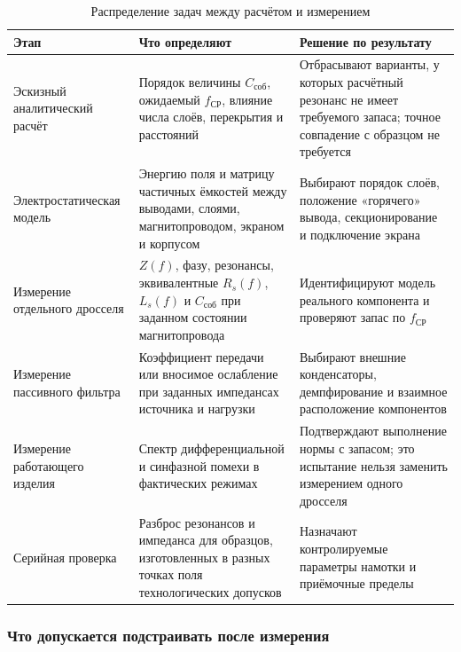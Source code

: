 \documentclass[14pt,a4paper]{extarticle}
\begin{document}
\begin{table}[htbp]
\begin{singlespace}
\caption{Распределение задач между расчётом и измерением}
\label{tab:calculation-versus-measurement}
\centering
\small
\begin{tabularx}{\textwidth}{>{\raggedright\arraybackslash}p{31mm}
>{\raggedright\arraybackslash}p{49mm}
>{\raggedright\arraybackslash}X}
\toprule
Этап & Что определяют & Решение по результату \\
\midrule
Эскизный аналитический расчёт &
Порядок величины $C_{\text{соб}}$, ожидаемый $f_{\text{СР}}$, влияние числа
слоёв, перекрытия и расстояний &
Отбрасывают варианты, у которых расчётный резонанс не имеет требуемого
запаса; точное совпадение с образцом не требуется \\
Электро\-статическая модель &
Энергию поля и матрицу частичных ёмкостей между выводами, слоями,
магнитопроводом, экраном и корпусом &
Выбирают порядок слоёв, положение «горячего» вывода, секционирование и
подключение экрана \\
Измерение отдельного дросселя &
$Z(f)$, фазу, резонансы, эквивалентные $R_s(f)$, $L_s(f)$ и
$C_{\text{соб}}$ при заданном состоянии магнитопровода &
Идентифицируют модель реального компонента и проверяют запас по
$f_{\text{СР}}$ \\
Измерение пассивного фильтра &
Коэффициент передачи или вносимое ослабление при заданных импедансах
источника и нагрузки &
Выбирают внешние конденсаторы, демпфирование и взаимное расположение
компонентов \\
Измерение работающего изделия &
Спектр дифференциальной и синфазной помехи в фактических режимах &
Подтверждают выполнение нормы с запасом; это испытание нельзя заменить
измерением одного дросселя \\
Серийная проверка &
Разброс резонансов и импеданса для образцов, изготовленных в разных точках
поля технологических допусков &
Назначают контролируемые параметры намотки и приёмочные пределы \\
\bottomrule
\end{tabularx}
\end{singlespace}
\end{table}

\subsubsection{Что допускается подстраивать после измерения}
\end{document}
